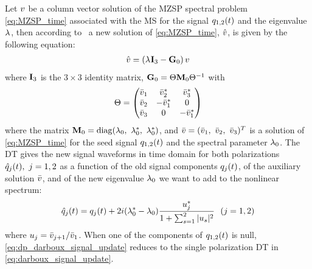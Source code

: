 
Let $\vecv$ be a column vector solution of the \ac{MZSP}  spectral problem \eqref{eq:MZSP_time} associated with the \ac{MS}  for the
signal $\nflds[1,2]$ and the eigenvalue $\eig$, then according to~\cite{Wright2003} a new solution of \eqref{eq:MZSP_time}, $\hat{\vecv}$, is given by the following equation:
 \begin{align}\label{eq:dp_darboux_eigenvectors_update}
 \hat{\vecv}=\left(\eig \mathcal{\matr{I}}_3-\matr{G}_0\right)\vecv
 \end{align}
where $\mathcal{\matr{I}}_3$ is the $3\times3$ identity matrix, $\matr{G}_0=\auxsolmat \matr{M}_0\auxsolmat^{-1}$ with
\begin{align}\label{eq:dp_auxsol_matrix}
 \auxsolmat= \begin{pmatrix}
       \auxsol_1 & \auxsol_2^* & \auxsol_3^* \\
       \auxsol_2 & -\auxsol_1^*  & 0 \\
       \auxsol_3 & 0 & -\auxsol_1^*
     \end{pmatrix}
\end{align}
where the matrix $\matr{M}_0=\diagmatr(\eig[0],~\eig[0]^*,~\eig[0]^*)$, and $ \auxsol=(\auxsol_1,~\auxsol_2,~\auxsol_3)^T$ is a solution of \eqref{eq:MZSP_time} for the seed signal $\nflds[1,2]$ and the spectral parameter $\eig[0]$. The \ac{DT} gives the new signal waveforms in time domain for both polarizations $\nfldsmod[j],~j=1,2$ as a function of the old signal components $\nflds[j]$, of the auxiliary solution $\auxsol$, and of the new eigenvalue $\eig[0]$ we want to add to the nonlinear spectrum:
\begin{align}\label{eq:dp_darboux_signal_update}
 \nfldsmod[j]=\nflds[j]+2i(\eig[0]^*-\eig[0])\frac{u_j^*}{1+\sum_{s=1}^2|u_s|^2} \ \ (j=1,2)
 \end{align}
where $u_j=\auxsol_{j+1}/\auxsol_1$. When one of the components of $\nflds[1,2]$
is null, \eqref{eq:dp_darboux_signal_update} reduces to the single polarization
\ac{DT} in \eqref{eq:darboux_signal_update}.



